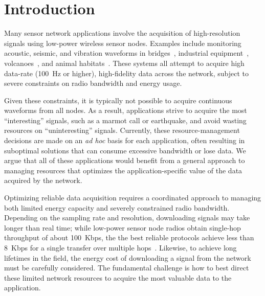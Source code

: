 \documentclass[lettersize]{sig-alternate-konrad}
\begin{document}
\vspace{-0.1in}
\vspace{-0.1in}

\section{Introduction}

Many sensor network applications involve the acquisition
of high-resolution signals using low-power wireless sensor nodes. Examples
include monitoring acoustic, seismic, and vibration waveforms in
bridges~\cite{ggb-ipsn07}, industrial equipment~\cite{intel-northseasensys}, 
volcanoes~\cite{volcano-osdi06}, and animal
habitats~\cite{girod-ipsn07,enviromic}.  These systems all attempt to acquire
high data-rate (100~Hz or higher), high-fidelity data across the network,
subject to severe constraints on radio bandwidth and energy usage.

Given these constraints, it is typically not possible to acquire
continuous waveforms from all nodes.  As a result, applications strive
to acquire the most ``interesting'' signals, such as a marmot call or
earthquake, and avoid wasting resources on ``uninteresting'' signals.
Currently, these resource-management decisions are made on an {\em ad
hoc} basis for each application, often resulting in suboptimal solutions
that can consume excessive bandwidth or lose data.  We argue that all
of these applications would benefit from a general approach to managing
resources that optimizes the application-specific value of the
data acquired by the network.

Optimizing reliable data acquisition requires a coordinated approach
to managing both limited energy capacity and severely constrained
radio bandwidth. Depending on the sampling rate and
resolution, downloading signals may take longer than real time;
while low-power 
sensor node radios obtain single-hop throughput of about 100~Kbps, the
the best reliable protocols achieve less than 
8~Kbps for a single transfer over multiple hops~\cite{flush-sensys07}. 
Likewise, to achieve long lifetimes in the field, the energy cost of 
downloading a signal from the network must be carefully considered. 
The fundamental challenge is how to best direct these limited network
resources to acquire the most valuable data to the application.
\end{document}
